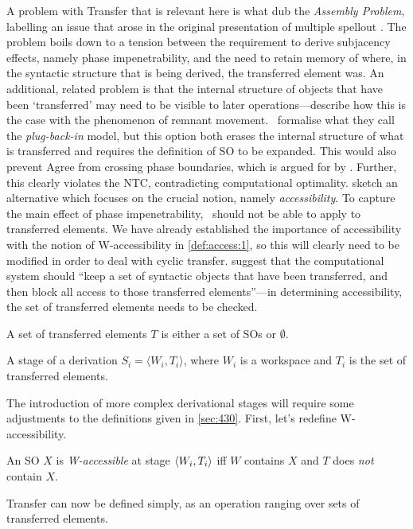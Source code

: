 A problem with Transfer that is relevant here is what \CS[67] dub the \textit{Assembly Problem}, labelling an issue that arose in the original presentation of multiple spellout \parencite{UriagerekaJ_1999}. The problem boils down to a tension between the requirement to derive subjacency effects, namely phase impenetrability, and the need to retain memory of where, in the syntactic structure that is being derived, the transferred element was. An additional, related problem is that the internal structure of objects that have been `transferred' may need to be visible to later operations---\CS[72--73] describe how this is the case with the phenomenon of remnant movement. \CS\ formalise what they call the \textit{plug-back-in} model, but this option both erases the internal structure of what is transferred and requires the definition of SO to be expanded. This would also prevent Agree from crossing phase boundaries, which is argued for by \textcite{BoskovicZ_2007a}. Further, this clearly violates the NTC, contradicting computational optimality. \CS[73--74] sketch an alternative which focuses on the crucial notion, namely \textit{accessibility}. To capture the main effect of phase impenetrability, \Merge\ should not be able to apply to transferred elements. We have already established the importance of accessibility with the notion of W-accessibility in \autoref{def:access:1}, so this will clearly need to be modified in order to deal with cyclic transfer. \CS[73--74] suggest that the computational system should ``keep a set of syntactic objects that have been transferred, and then block all access to those transferred elements''---in determining accessibility, the set of transferred elements needs to be checked.

\begin{definition}
    A set of transferred elements $T$ is either a set of SOs or $\emptyset$.
\end{definition}

\begin{definition}\label{def:stage}
    A stage of a derivation $S_i = \langle W_i, T_i \rangle$, where $W_i$ is a workspace and $T_i$ is the set of transferred elements.
\end{definition}
\noindent
The introduction of more complex derivational stages will require some adjustments to the definitions given in \autoref{sec:430}. First, let's redefine W-accessibility.

\begin{definition}\label{def:access:2}
    An SO $X$ is \textit{W-accessible} at stage $\langle W_{i},T_{i} \rangle$ iff $W$ contains $X$ and $T$ does \textit{not} contain $X$.
\end{definition}
\noindent
Transfer can now be defined simply, as an operation ranging over sets of transferred elements.

